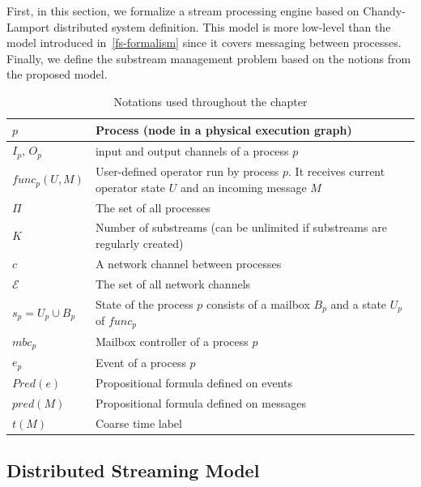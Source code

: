 First, in this section, we formalize a stream processing engine based on Chandy-Lamport distributed system definition. This model is more low-level than the model introduced in~\ref{fs-formalism} since it covers messaging between processes. Finally, we define the substream management problem based on the notions from the proposed model.

\begin{table}[!b]
\begin {center}
    \caption{Notations used throughout the chapter}
    \footnotesize
    \begin{tabular}{l|p{5cm}}
        \hline
        $p$ & Process (node in a physical execution graph) \\ 
        \hline
        $I_p$, $O_p$ & input and output channels of a process $p$ \\ 
        \hline
        $func_p(U, M)$ & User-defined operator run by process $p$. It receives current operator state $U$ and an incoming message $M$ \\ 
        \hline
        $\Pi$ & The set of all processes  \\
        \hline
        $K$ & Number of substreams (can be unlimited if substreams are regularly created) \\
        \hline
        $c$ & A network channel between processes  \\
        \hline
        $\mathcal{E}$ & The set of all network channels  \\
        \hline
        $s_p = U_p \cup B_p$ & State of the process $p$ consists of a mailbox $B_p$ and a state $U_p$ of $func_p$ \\
        \hline
        $mbc_{p}$ & Mailbox controller of a process $p$ \\
        \hline
        $e_{p}$ & Event of a process $p$ \\
        \hline
        $Pred(e)$ & Propositional formula defined on events \\
        \hline
        $pred(M)$ & Propositional formula defined on messages\\
        \hline
        $t(M)$ & Coarse time label \\
    \end{tabular}
    \label{notations-substreams}
\end {center}
\end{table}

\subsection{Distributed Streaming Model}
\label{fs-acker-spe-model}

